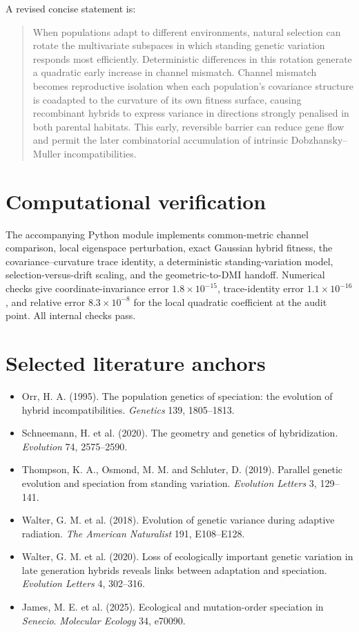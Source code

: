 \documentclass[11pt,a4paper]{article}
\begin{document}
A revised concise statement is:

\begin{quote}
When populations adapt to different environments, natural selection can rotate the multivariate subspaces in which standing genetic variation responds most efficiently. Deterministic differences in this rotation generate a quadratic early increase in channel mismatch. Channel mismatch becomes reproductive isolation when each population's covariance structure is coadapted to the curvature of its own fitness surface, causing recombinant hybrids to express variance in directions strongly penalised in both parental habitats. This early, reversible barrier can reduce gene flow and permit the later combinatorial accumulation of intrinsic Dobzhansky--Muller incompatibilities.
\end{quote}

\section{Computational verification}

The accompanying Python module implements common-metric channel comparison, local eigenspace perturbation, exact Gaussian hybrid fitness, the covariance--curvature trace identity, a deterministic standing-variation model, selection-versus-drift scaling, and the geometric-to-DMI handoff. Numerical checks give coordinate-invariance error \(1.8\times10^{-15}\), trace-identity error \(1.1\times10^{-16}\), and relative error \(8.3\times10^{-8}\) for the local quadratic coefficient at the audit point. All internal checks pass.

\section*{Selected literature anchors}
\begin{small}
\begin{itemize}[leftmargin=1.5em]
\item Orr, H. A. (1995). The population genetics of speciation: the evolution of hybrid incompatibilities. \textit{Genetics} 139, 1805--1813.
\item Schneemann, H. et al. (2020). The geometry and genetics of hybridization. \textit{Evolution} 74, 2575--2590.
\item Thompson, K. A., Osmond, M. M. and Schluter, D. (2019). Parallel genetic evolution and speciation from standing variation. \textit{Evolution Letters} 3, 129--141.
\item Walter, G. M. et al. (2018). Evolution of genetic variance during adaptive radiation. \textit{The American Naturalist} 191, E108--E128.
\item Walter, G. M. et al. (2020). Loss of ecologically important genetic variation in late generation hybrids reveals links between adaptation and speciation. \textit{Evolution Letters} 4, 302--316.
\item James, M. E. et al. (2025). Ecological and mutation-order speciation in \textit{Senecio}. \textit{Molecular Ecology} 34, e70090.
\end{itemize}
\end{small}
\end{document}
